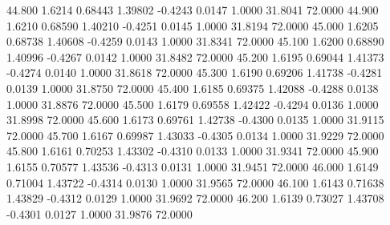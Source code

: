   44.800   1.6214   0.68443   1.39802  -0.4243   0.0147   1.0000  31.8041  72.0000
  44.900   1.6210   0.68590   1.40210  -0.4251   0.0145   1.0000  31.8194  72.0000
  45.000   1.6205   0.68738   1.40608  -0.4259   0.0143   1.0000  31.8341  72.0000
  45.100   1.6200   0.68890   1.40996  -0.4267   0.0142   1.0000  31.8482  72.0000
  45.200   1.6195   0.69044   1.41373  -0.4274   0.0140   1.0000  31.8618  72.0000
  45.300   1.6190   0.69206   1.41738  -0.4281   0.0139   1.0000  31.8750  72.0000
  45.400   1.6185   0.69375   1.42088  -0.4288   0.0138   1.0000  31.8876  72.0000
  45.500   1.6179   0.69558   1.42422  -0.4294   0.0136   1.0000  31.8998  72.0000
  45.600   1.6173   0.69761   1.42738  -0.4300   0.0135   1.0000  31.9115  72.0000
  45.700   1.6167   0.69987   1.43033  -0.4305   0.0134   1.0000  31.9229  72.0000
  45.800   1.6161   0.70253   1.43302  -0.4310   0.0133   1.0000  31.9341  72.0000
  45.900   1.6155   0.70577   1.43536  -0.4313   0.0131   1.0000  31.9451  72.0000
  46.000   1.6149   0.71004   1.43722  -0.4314   0.0130   1.0000  31.9565  72.0000
  46.100   1.6143   0.71638   1.43829  -0.4312   0.0129   1.0000  31.9692  72.0000
  46.200   1.6139   0.73027   1.43708  -0.4301   0.0127   1.0000  31.9876  72.0000

